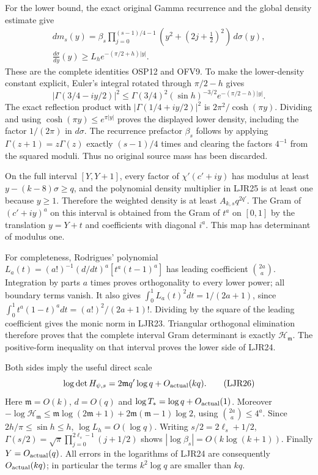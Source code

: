 \documentclass[11pt,a4paper]{article}
\begin{document}
For the lower bound, the exact original Gamma recurrence and
the global density estimate give
\[
 \begin{gathered}
 dm_s(y)=\beta_s
       \prod_{j=0}^{(s-1)/4-1}(y^2+(2j+\tfrac12)^2)\,d\sigma(y),\\
 \frac{d\sigma}{dy}(y)
 \ge L_h e^{-(\pi/2+h)|y|}.
 \end{gathered}\tag{LJR25}
\]
These are the complete identities OSP12 and OFV9. To make
the lower-density constant explicit, Euler's integral rotated
through $\pi/2-h$ gives
\[
 |\Gamma(3/4-iy/2)|^2\le
 \Gamma(3/4)^2(\sin h)^{-3/2}e^{-(\pi/2-h)|y|}.
\]
The exact reflection product with
$|\Gamma(1/4+iy/2)|^2$ is $2\pi^2/\cosh(\pi y)$.
Dividing and using $\cosh(\pi y)\le e^{\pi|y|}$
proves the displayed lower density, including the factor
$1/(2\pi)$ in $d\sigma$.
The recurrence prefactor $\beta_s$ follows by applying
$\Gamma(z+1)=z\Gamma(z)$ exactly $(s-1)/4$ times and
clearing the factors $4^{-1}$ from the squared moduli.
Thus no original source mass has been discarded.

On the full interval $[Y,Y+1]$, every factor of
$\chi'(c'+iy)$ has modulus at least
$y-(k-8)\sigma\ge q$, and the polynomial density
multiplier in LJR25 is at least one because $y\ge1$.
Therefore the weighted density is at least
$A_{k,s}q^{2q'}$. The Gram of $(c'+iy)^a$ on this interval
is obtained from the Gram of $t^a$ on $[0,1]$ by the
translation $y=Y+t$ and coefficients with diagonal $i^a$.
This map has determinant of modulus one.

For completeness, Rodrigues' polynomial
$L_a(t)=(a!)^{-1}(d/dt)^a[t^a(t-1)^a]$
has leading coefficient $\binom{2a}{a}$.
Integration by parts $a$ times proves orthogonality to
every lower power; all boundary terms vanish.
It also gives
$\int_0^1L_a(t)^2dt=1/(2a+1)$, since
$\int_0^1t^a(1-t)^adt=(a!)^2/(2a+1)!$.
Dividing by the square of the leading coefficient gives
the monic norm in LJR23. Triangular orthogonal elimination
therefore proves that the complete interval Gram determinant
is exactly $\mathcal H_{\mathfrak m}$.
The positive-form inequality on that interval proves the
lower side of LJR24.

Both sides imply the useful direct scale
\[
 \log\det H_{\psi,s}
      =2\mathfrak m q'\log q+O_{\rm actual}(kq).
 \tag{LJR26}
\]
Here $\mathfrak m=O(k)$, $d=O(q)$ and
$\log T_*=\log q+O_{\rm actual}(1)$.
Moreover
$-\log\mathcal H_{\mathfrak m}
 \le\mathfrak m\log(2\mathfrak m+1)
                 +2\mathfrak m(\mathfrak m-1)\log2$,
using $\binom{2a}{a}\le4^a$.
Since $2h/\pi\le\sin h\le h$, $\log L_h=O(\log q)$.
Writing $s/2=2\ell_s+1/2$,
$\Gamma(s/2)=\sqrt\pi\prod_{j=0}^{2\ell_s-1}(j+1/2)$
shows $|\log\beta_s|=O(k\log(k+1))$.
Finally $Y=O_{\rm actual}(q)$.
All errors in the logarithms of LJR24 are consequently
$O_{\rm actual}(kq)$; in particular the terms
$k^2\log q$ are smaller than $kq$.
\end{document}
